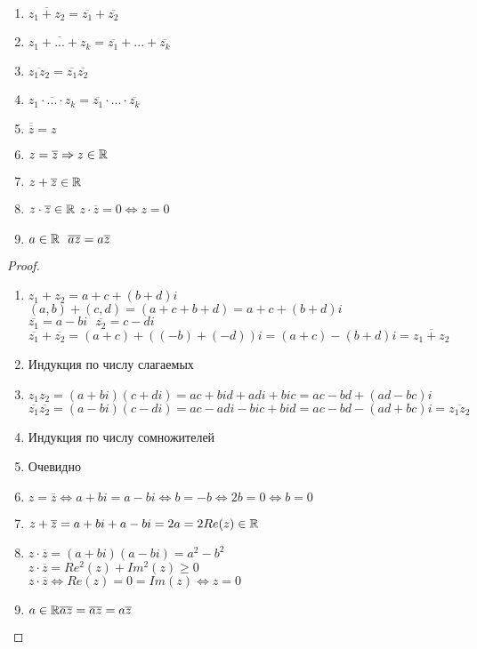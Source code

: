 \begin{properties}
	\begin{enumerate}
		\item $ \overline{z_1 + z_2} = \overline{z_1} + \overline{z_2} $ 
		\item $ \overline{z_1 + ... + z_k} =   \overline{z_1} + ... + \overline{z_k}$ 
		\item $ \overline{z_1z_2} = \overline{z_1}\overline{z_2} $ 
		\item $ \overline{z_1 \cdot ... \cdot z_k} =   \overline{z_1} \cdot ... \cdot \overline{z_k}$ 
		\item $ \overline{\overline{z}} = z $ 
		\item $ z = \overline{z} \Rightarrow z \in \mathbb{R} $ 
		\item $ z + \overline{z} \in \mathbb{R} $ 
		\item $ z \cdot \overline{z} \in \mathbb{R} $  $z \cdot \overline{z} = 0 \Leftrightarrow z = 0 $
		\item $ a \in \mathbb{R} \ \ \overline{az} = a \overline{z} $
	\end{enumerate}
	\begin{proof}
		\begin{enumerate}
			\item $ z_1 + z_2 = a + c + (b+d) i $ \\
			$ (a, b) + (c, d) = (a+c + b+ d) = a + c + (b+d) i $  \\
			$ \overline{z_1} = a- bi \ \ \ \overline{z_2} = c - di $ \\
			$ \overline{z_1} + \overline{z_2} = (a+c) + ((-b) + (-d))i = (a+c) - (b+d) i = \overline{z_1 + z_2} $
			\item Индукция по числу слагаемых 
			\item $ z_1z_2 = (a + bi)(c+di) = ac+bid+adi + bic = ac - bd + (ad-bc)i $ \\
			$ \overline{z_1}\overline{z_2} = (a-bi)(c-di) = ac - adi - bic + bid = ac - bd - (ad + bc) i = \overline{z_1z_2} $
			\item Индукция по числу сомножителей 
			\item Очевидно
			\item $ z = \overline{z} \Leftrightarrow a + bi = a - bi \Leftrightarrow b = -b \Leftrightarrow 2b = 0 \Leftrightarrow b = 0 $
			\item $ z + \overline{z} = a + bi + a - bi = 2a = 2 Re(z) \in \mathbb{R} $
			\item  $ z \cdot \overline{z} = (a + bi) ( a- bi ) = a^2 - b^2 $ \\
			$ z \cdot \overline{z} = Re^2(z) + Im^2(z) \geq 0 $\\
			$ z \cdot \overline{z} \Leftrightarrow Re(z) = 0 = Im(z) \Leftrightarrow z = 0 $
			\item $ a \in \mathbb{R} \overline{az} = \overline{a} \overline{z} = a \overline{z}$
		\end{enumerate}
	\end{proof}
\end{properties}
